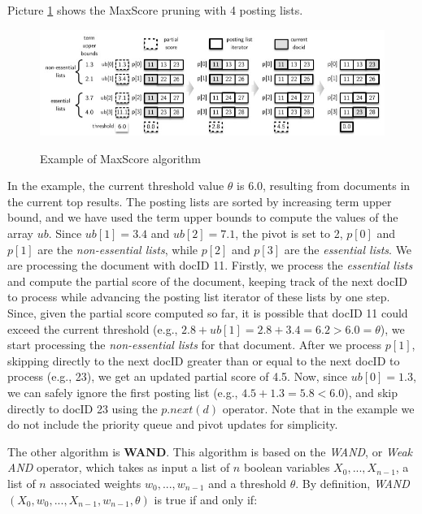 Picture \ref{max score ex} shows the MaxScore pruning with 4 posting lists.

\begin{figure}[h!]
		\centering
		\includegraphics[scale = 1.8]{img/max score ex.jpg}
        \label{max score ex}
        \caption{Example of MaxScore algorithm}
\end{figure}

In the example, the current threshold value $\theta$ is 6.0, resulting from documents in the current top results. The posting lists are sorted by increasing term upper bound, and we have used the term upper bounds to compute the values of the array $ub$. Since $ub[1] = 3.4$ and $ub[2] = 7.1$, the pivot is set to 2, $p[0]$ and $p[1]$ are the \textit{non-essential lists}, while $p[2]$ and $p[3]$ are the \textit{essential lists}. We are processing the document with docID 11. Firstly, we process the \textit{essential lists} and compute the partial score of the document, keeping track of the next docID to process while advancing the posting list iterator of these lists by one step. Since, given the partial score computed so far, it is possible that docID 11 could exceed the current threshold (e.g., $2.8 + ub[1] = 2.8 + 3.4 = 6.2 > 6.0 = \theta$), we start processing the \textit{non-essential lists} for that document. After we process $p[1]$, skipping directly to the next docID greater than or equal to the next docID to process (e.g., 23), we get an updated partial score of 4.5. Now, since $ub[0]= 1.3$, we can safely ignore the first posting list (e.g., $4.5 + 1.3 = 5.8 < 6.0$), and skip directly to docID 23 using the $p.next(d)$ operator. Note that in the example we do not include the priority queue and pivot updates for simplicity.

The other algorithm is \textbf{WAND}. This algorithm is based on the \textit{WAND}, or \textit{Weak AND} operator, which takes as input a list of $n$ boolean variables $X_0, . . . ,X_{n−1}$, a list of $n$ associated weights $w_0, . . . , w_{n−1}$ and a threshold $\theta$. By definition, \textit{WAND} $(X_0, w_0, . . . ,X_{n−1}, w_{n−1}, \theta)$ is true if and only if: 

